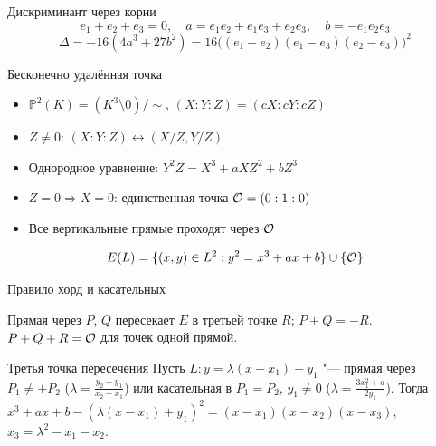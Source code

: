\documentclass{ca-slides}
\begin{document}
\begin{canvasframe}{Дискриминант через корни}
  \[
    e_1 + e_2 + e_3 = 0, \quad a = e_1 e_2 + e_1 e_3 + e_2 e_3, \quad b = -e_1 e_2 e_3
  \]
  \[
    \Delta = -16(4a^3 + 27b^2) = 16 \bigl((e_1 - e_2)(e_1 - e_3)(e_2 - e_3)\bigr)^2
  \]
  \penspace[0.3\textheight]
\end{canvasframe}

\begin{canvasframe}{Бесконечно удалённая точка}
  \begin{itemize}
    \item $\mathbb P^2(K) = (K^3 \setminus 0)/\sim$, \quad $(X : Y : Z) = (cX : cY : cZ)$
    \item $Z \ne 0$: $(X : Y : Z) \leftrightarrow (X/Z, Y/Z)$
    \item Однородное уравнение: \quad $Y^2 Z = X^3 + aXZ^2 + bZ^3$
    \item $Z = 0 \Rightarrow X = 0$: единственная точка $\mathcal{O} = (0 : 1 : 0)$
    \item Все вертикальные прямые проходят через $\mathcal{O}$
  \end{itemize}
  \[ E(L) = \{(x, y) \in L^2 : y^2 = x^3 + ax + b\} \cup \{\mathcal{O}\} \]
\end{canvasframe}

\begin{canvasframe}{Правило хорд и касательных}
  \centering
  \ecaddfigure[scale=0.5]\qquad\qquad\ecdoublefigure[scale=0.5]

  \raggedright
  Прямая через $P$, $Q$ пересекает $E$ в третьей точке $R$; \quad $P + Q = -R$.\quad
  $P + Q + R = \mathcal{O}$ для точек одной прямой.
\end{canvasframe}

\begin{theoremframe}[lemma]{Третья точка пересечения}
  Пусть $L\colon y = \lambda(x - x_1) + y_1$ "--- прямая через $P_1 \ne \pm P_2$
  ($\lambda = \frac{y_2 - y_1}{x_2 - x_1}$) или касательная в $P_1 = P_2$, $y_1 \ne 0$
  ($\lambda = \frac{3x_1^2 + a}{2y_1}$). Тогда
  $x^3 + ax + b - (\lambda(x - x_1) + y_1)^2 = (x - x_1)(x - x_2)(x - x_3)$, \
  $x_3 = \lambda^2 - x_1 - x_2$.
\end{theoremframe}
\end{document}
